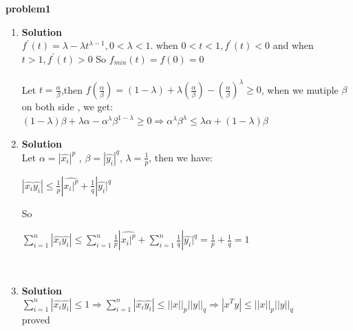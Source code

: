 \documentclass[english,onecolumn,UTF8]{IEEEtran}
\begin{document}
\textbf{problem1}
\begin{enumerate}
\item \textbf{Solution}\\
$f^{'}(t)=\lambda - \lambda t^{\lambda-1}, 0<\lambda<1$. \quad
when $0<t<1,f^{'}(t)<0$ and when $t>1,f^{'}(t)>0$\quad
So $f_{min}(t)=f(0)=0$
\\
\\
Let $t=\frac{\alpha}{\beta}$,\quad then $f(\frac{\alpha}{\beta})=(1-\lambda)+\lambda(\frac{\alpha}{\beta})-(\frac{\alpha}{\beta})^{\lambda}\geq 0$, when we mutiple $\beta$ on both side , we get:\\
$(1-\lambda)\beta+\lambda\alpha-\alpha^{\lambda}\beta^{1-\lambda}\geq 0 \Rightarrow \alpha^{\lambda}\beta^{\lambda}\leq \lambda \alpha +(1-\lambda)\beta$ 
~\\

\item\textbf{Solution}\\
Let $\alpha = |\hat{x_{i}}|^{p}$ , $\beta = |\hat{y_{i}}|^{q}$, $\lambda=\frac{1}{p}$, then we have:\\
\begin{center}
$ |\hat{x_{i}}\hat{y_{i}}|\leq\frac{1}{p}|\hat
{x_{i}|^{p}}+\frac{1}{q}|\hat{y_{i}}|^{q}
$
\end{center}
So
\begin{center}
	$ \sum_{i=1}^n|\hat{x_{i}}\hat{y_{i}}|\leq \sum_{i=1}^n\frac{1}{p}|\hat
	{x_{i}|^{p}}+\sum_{i=1}^n\frac{1}{q}|\hat{y_{i}}|^{q}=\frac{1}{p}+\frac{1}{q}=1
	$
\end{center}
~\\
\item\textbf{Solution}\\
$\sum_{i=1}^n|\hat{x_{i}}\hat{y_{i}}|\leq 1
\Rightarrow \sum_{i=1}^n|\hat{x_{i}}\hat{y_{i}}|\leq||x||_{p}||y||_{q}\Rightarrow |x^{T}y|\leq ||x||_{p}||y||_{q}$\\
proved

\end{enumerate}
\end{document}
